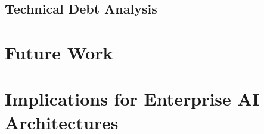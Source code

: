 \documentclass[a4paper,twoside]{sapthesis}
\begin{document}
\subsection{Technical Debt Analysis}
%
%
%
%
%
%
%
%

\section{Future Work}
\label{sec:future-work}

\section{Implications for Enterprise AI Architectures}
\label{sec:implications}
\end{document}
